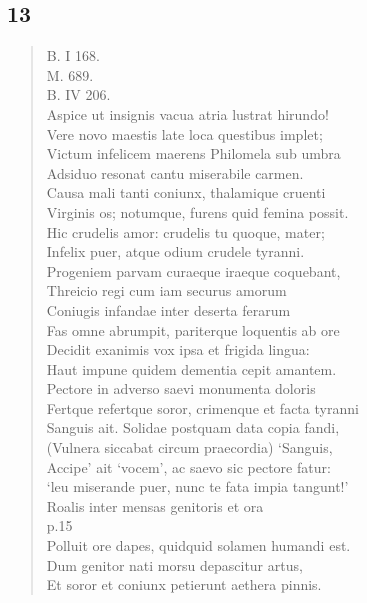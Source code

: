 \documentclass[11pt, a4paper]{report}
\begin{document}
            \subsection*{13}
      \begin{verse}
      B. I 168. \\ M. 689. \\ B. IV 206. \\ Aspice ut insignis vacua atria lustrat hirundo! \\ Vere novo maestis late loca questibus implet; \\ Victum infelicem maerens Philomela sub umbra \\ Adsiduo resonat cantu miserabile carmen. \\ Causa mali tanti coniunx, thalamique cruenti \\ Virginis os; notumque, furens quid femina possit. \\ Hic crudelis amor: crudelis tu quoque, mater; \\ Infelix puer, atque odium crudele tyranni. \\ Progeniem parvam curaeque iraeque coquebant, \\ Threicio regi cum iam securus amorum \\ Coniugis infandae inter deserta ferarum \\ Fas omne abrumpit, pariterque loquentis ab ore \\ Decidit exanimis vox ipsa  \lbrack et frigida lingua: \\ Haut impune quidem dementia cepit amantem. \\ Pectore in adverso saevi monumenta doloris \\ Fertque refertque soror, crimenque  \lbrack et \rbrack  facta tyranni \\ Sanguis ait. Solidae postquam data copia fandi, \\ (Vulnera siccabat circum praecordia) ‘Sanguis, \\ Accipe’  \lbrack ait \rbrack  ‘vocem’, ac saevo sic pectore fatur: \\ ‘leu miserande puer, nunc te fata impia tangunt!’ \\ Roalis inter mensas genitoris et ora \\ p.15 \\ Polluit ore dapes, quidquid solamen humandi est. \\ Dum genitor nati morsu depascitur artus, \\ Et soror et coniunx petierunt aethera pinnis. \\ 
      \end{verse}
  
\end{document}
